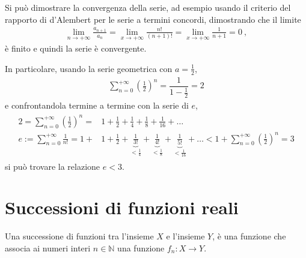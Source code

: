 \documentclass[letterpaper,10pt,italian]{jupyterBook}
\begin{document}
\sphinxAtStartPar
Si può dimostrare la convergenza della serie, ad esempio usando il criterio del rapporto di d’Alembert per le serie a termini concordi, dimostrando che il limite
\begin{equation*}
\begin{split}\lim_{n \rightarrow +\infty} \frac{a_{n+1}}{a_n} = \lim_{x \rightarrow +\infty}\frac{n!}{(n+1)!} = \lim_{x \rightarrow +\infty} \frac{1}{n+1} = 0 \ ,\end{split}
\end{equation*}
\sphinxAtStartPar
è finito e quindi la serie è convergente.

\sphinxAtStartPar
In particolare, usando la serie geometrica con \(a = \frac{1}{2}\),
\begin{equation*}
\begin{split}\sum_{n=0}^{+\infty} \left(\frac{1}{2} \right)^n = \dfrac{1}{1 - \frac{1}{2}} = 2\end{split}
\end{equation*}
\sphinxAtStartPar
e confrontandola termine a termine con la serie di \(e\),
\begin{equation*}
\begin{split}\begin{aligned}
  2  = \sum_{n=0}^{+\infty} \left(\frac{1}{2} \right)^n = & 1 + \frac{1}{2} + \frac{1}{4} + \frac{1}{8} + \frac{1}{16} + \dots \\
  e := \sum_{n=0}^{+\infty} \frac{1}{n!} = 1 + & 1 + \frac{1}{2} + \underbrace{\frac{1}{3!}}_{<\frac{1}{4}} + \underbrace{\frac{1}{4!}}_{< \frac{1}{8}} + \underbrace{\frac{1}{5!}}_{< \frac{1}{16}} + \dots <
    1 + \sum_{n=0}^{+\infty} \left( \frac{1}{2} \right)^n = 3
\end{aligned}\end{split}
\end{equation*}
\sphinxAtStartPar
si può trovare la relazione \(e < 3\).

\sphinxAtStartPar
{} 


\section{Successioni di funzioni reali}
\label{\detokenize{ch/series:successioni-di-funzioni-reali}}\label{\detokenize{ch/series:math-hs-series-fun-sequences}}
\sphinxAtStartPar
{} Una successione di funzioni tra l’insieme \(X\) e l’insieme \(Y\), è una funzione che associa ai numeri interi \(n \in \mathbb{N}\) una funzione \(f_n: X \rightarrow Y\).
\end{document}
